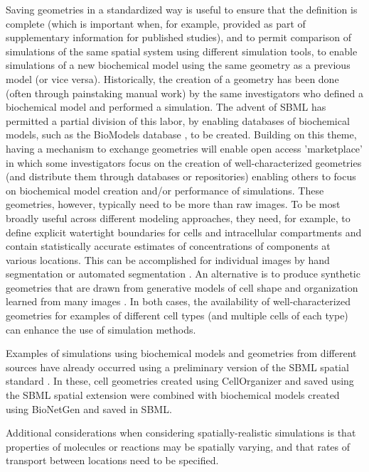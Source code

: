 Saving geometries in a standardized way is useful to ensure that the definition is complete (which is important when, for example, provided as part of supplementary information for published studies), and to permit comparison of simulations of the same spatial system using different simulation tools, to enable simulations of a new biochemical model using the same geometry as a previous model (or vice versa). Historically, the creation of a geometry has been done (often through painstaking manual work) by the same investigators who defined a biochemical model and performed a simulation. The advent of SBML has permitted a partial division of this labor, by enabling databases of biochemical models, such as the BioModels database \citep{lenovere:2006, li:2010, malik:2020}, to be created. Building on this theme, having a mechanism to exchange geometries will enable  open access 'marketplace' in which some investigators focus on the creation of well-characterized geometries (and distribute them through databases or repositories) enabling others to focus on biochemical model creation and/or performance of simulations. These geometries, however, typically need to be more than raw images. To be most broadly useful across different modeling approaches, they need, for example, to define explicit watertight boundaries for cells and intracellular compartments and contain statistically accurate estimates of concentrations of components at various locations. This can be accomplished for individual images by hand segmentation \citep{loew:2001} or automated segmentation \citep{perez:2014}. An alternative is to produce synthetic geometries that are drawn from generative models of cell shape and organization learned from many images \citep{zhao:2007}. In both cases, the availability of well-characterized geometries for examples of different cell types (and multiple cells of each type) can enhance the use of simulation methods.

Examples of simulations using biochemical models and geometries from different sources have already occurred using a preliminary version of the SBML spatial standard \citep{sullivan:2015, donovan:2016}. In these, cell geometries created using CellOrganizer and saved using the SBML spatial extension were combined with biochemical models created using BioNetGen and saved in SBML.

Additional considerations when considering spatially-realistic simulations is that properties of molecules or reactions may be spatially varying, and that rates of transport between locations need to be specified.

